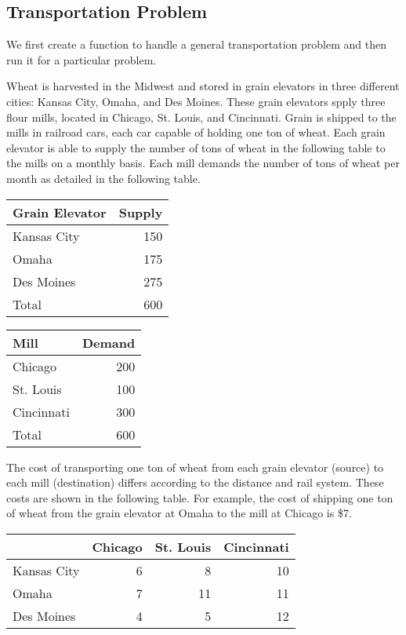 \documentclass[11pt]{article}
\begin{document}
\subsection{Transportation Problem}
\label{sec:org9d67725}
We first create a function to handle a general transportation problem and then run it for a particular problem.

Wheat is harvested in the Midwest and stored in grain elevators in three different cities: Kansas City, Omaha, and Des Moines.  These grain elevators spply three flour mills, located in Chicago, St. Louis, and Cincinnati.  Grain is shipped to the mills in railroad cars, each car capable of holding one ton of wheat.  Each grain elevator is able to supply the number of tons of wheat in the following table to the mills on a monthly basis.  Each mill demands the number of tons of wheat per month as detailed in the following table.

\begin{center}
\begin{tabular}{lr}
Grain Elevator & Supply\\
\hline
Kansas City & 150\\
Omaha & 175\\
Des Moines & 275\\
\hline
Total & 600\\
\end{tabular}
\end{center}

\begin{center}
\begin{tabular}{lr}
Mill & Demand\\
\hline
Chicago & 200\\
St. Louis & 100\\
Cincinnati & 300\\
\hline
Total & 600\\
\end{tabular}
\end{center}

The cost of transporting one ton of wheat from each grain elevator (source) to each mill (destination) differs according to the distance and rail system.  These costs are shown in the following table.  For example, the cost of shipping one ton of wheat from the grain elevator at Omaha to the mill at Chicago is \$7.

\begin{center}
\begin{tabular}{lrrr}
 & Chicago & St. Louis & Cincinnati\\
\hline
Kansas City & 6 & 8 & 10\\
Omaha & 7 & 11 & 11\\
Des Moines & 4 & 5 & 12\\
\end{tabular}
\end{center}
\end{document}

